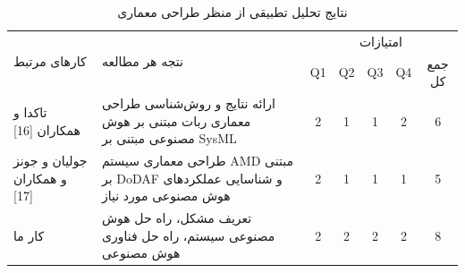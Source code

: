\documentclass[a4paper,10pt]{article}
\begin{document}
    \begin{table}
                        
        \centering
        \caption{نتایج تحلیل تطبیقی از منظر طراحی معماری}
        \begin{tabularx}{\textwidth}{ p{4cm} p{9.3cm} c c c c c }

            \hline
            
            \multirow{2}{*}{کارهای مرتبط} & \multirow{2}{*}{نتجه هر مطالعه} & \multicolumn{5}{c}{امتیازات} \\
            &  & Q1 & Q2 & Q3 & Q4 & جمع کل \\
            
            \hline

            تاکدا و همکاران [16] & ارائه نتایج و روش‌شناسی طراحی معماری ربات مبتنی بر هوش مصنوعی مبتنی بر SysML & 2 & 1 & 1 & 2 & 6 \\

            جولیان و جونز و همکاران [17] & طراحی معماری سیستم AMD مبتنی بر DoDAF و شناسایی عملکردهای هوش مصنوعی مورد نیاز & 2 & 1 & 1 & 1 & 5 \\

            کار ما & تعریف مشکل، راه حل هوش مصنوعی سیستم، راه حل فناوری هوش مصنوعی & 2 & 2 & 2 & 2 & 8 \\

            \hline

        \end{tabularx}

    \end{table}

    \newpage

\end{document}
